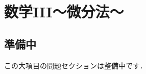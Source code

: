\documentclass[../../ms_q.tex]{subfiles}
\begin{document}
\section{数学III～微分法～}

\subsection*{準備中}
この大項目の問題セクションは整備中です．
\end{document}
